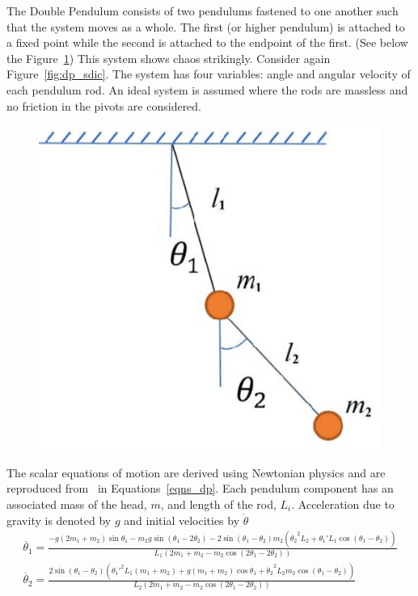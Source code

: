 The Double Pendulum consists of two pendulums fastened to one another such that the system moves as a whole. The first (or higher pendulum) is attached to a fixed point while the second is attached to the endpoint of the first. (See below the Figure~\ref{fig:dp_setup})
This system shows chaos strikingly. Consider again Figure~\ref{fig:dp_sdic}.
The system has four variables: angle and angular velocity of each pendulum rod. An ideal system is assumed where the rods are massless and no friction in the pivots are considered.
\begin{figure}[ht]
  \includegraphics[scale=0.35]{Graphs/_dp_setup.eps}
  \centering
\label{fig:dp_setup}
\end{figure}

The scalar equations of motion are derived using Newtonian physics and are reproduced from~\cite{DPFormulas} in Equations~\ref{eqns_dp}. Each pendulum component has an associated mass of the head, $m$, and length of the rod, $L_i$. Acceleration due to gravity is denoted by $g$ and initial velocities by $\dot{\theta}$
\begin{eqnarray}\label{eqns_dp}
  \ddot{\theta_{1}}  = \frac{-g(2m_1+m_2)\sin{\theta_1} - m_2g\sin(\theta_1-2\theta_2) - 2\sin(\theta_1-\theta_2)m_2({\dot{\theta_{2}}}^{2}L_2 + {\theta_{1}'}L_1\cos(\theta_1-\theta_2))} {L_1(2m_1 + m_2 -m_2\cos(2\theta_1 - 2\theta_2))}
  \\
  \ddot{\theta_{2}} = \frac{2\sin(\theta_1-\theta_2)(\theta_{1}'^{2}L_1(m_1+m_2) + g(m_1+m_2)\cos\theta_1 + \dot{\theta_{2}}^{2}L_2m_2\cos(\theta_1-\theta_2))}{L_2(2m_1 + m_2 -m_2\cos(2\theta_1 - 2\theta_2))}
\end{eqnarray}


